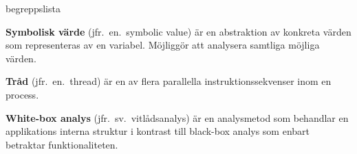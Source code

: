 \begin{labeling}{begreppslista}
    \item [\textbf{Symbolisk värde}] (jfr.\ en.\ symbolic value) är en
    abstraktion av konkreta värden som representeras av en
    variabel. Möjliggör att analysera samtliga möjliga värden.

    \item [\textbf{Tråd}] (jfr.\ en.\ thread) är en av flera
    parallella instruktionssekvenser inom en process.

    \item [\textbf{White-box analys}] (jfr.\ sv.\ vitlådsanalys) är en
    analysmetod som behandlar en applikations interna struktur i
    kontrast till black-box analys som enbart betraktar
    funktionaliteten.

\end{labeling}
